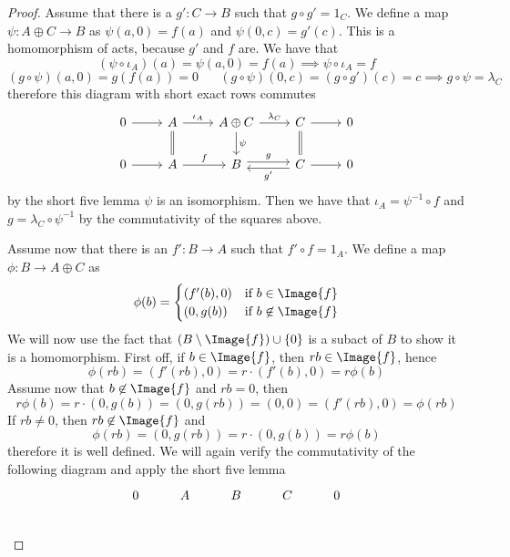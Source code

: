 \begin{proof}[Proof]
    Assume that there is a $g':C \to B$ such that $g\circ g' = 1_C$. We define a map $\psi: A\oplus C \to B$ as 
    $\psi(a,0) = f(a)$ and $\psi(0,c) = g'(c)$. This is a homomorphism of acts, because $g'$ and $f$ are. We have that 
    \[
        (\psi\circ \iota_A)(a) = \psi(a,0) = f(a) \implies \psi\circ\iota_A = f
    \]
    \[
        (g\circ\psi)(a,0) = g(f(a)) = 0\hspace{20pt} (g\circ\psi)(0,c) = (g\circ g')(c) = c \implies g\circ\psi = \lambda_C
    \]
    therefore this diagram with short exact rows commutes
    \[\begin{tikzcd}
	0 & A & {A\oplus C} & C & 0 \\
	0 & A & B & C & 0
	\arrow[from=1-1, to=1-2]
	\arrow["{\iota_A}", from=1-2, to=1-3]
	\arrow[equal,from=1-2, to=2-2]
	\arrow["{\lambda_C}", from=1-3, to=1-4]
	\arrow["\psi", from=1-3, to=2-3]
	\arrow[from=1-4, to=1-5]
	\arrow[equal,from=1-4, to=2-4]
	\arrow[from=2-1, to=2-2]
	\arrow["f", from=2-2, to=2-3]
	\arrow["g", shift left, from=2-3, to=2-4]
	\arrow["{g'}", shift left, from=2-4, to=2-3]
	\arrow[from=2-4, to=2-5]
\end{tikzcd}\]
    by the short five lemma $\psi$ is an isomorphism. Then we have that $\iota_A = \psi^{-1}\circ f$ and $g = \lambda_C\circ\psi^{-1}$ 
    by the commutativity of the squares above.\par 
    Assume now that there is an $f': B \to A$ such that $f'\circ f = 1_A$. We define a map $\phi: B \to A\oplus C$ as
    \[
        \phi(b) = \begin{cases}
            (f'(b),0) & \text{if } b\in\Image{f} \\
            (0,g(b)) & \text{if } b\not\in\Image{f}
        \end{cases}
    \]
    We will now use the fact that $(B\setminus\Image{f})\cup\{0\}$ is a subact of $B$ to show it is a homomorphism. First off, if 
    $b\in\Image{f}$, then $rb\in\Image{f}$, hence 
    \[
    \phi(rb) = (f'(rb),0)= r\cdot(f'(b),0) = r\phi(b)
    \]
    Assume now that $b\not\in\Image{f}$ and $rb=0$, then 
    \[
        r\phi(b) = r\cdot(0,g(b)) = (0,g(rb)) = (0,0) = (f'(rb),0) = \phi(rb)
    \]
    If $rb\neq 0$, then $rb\not\in\Image{f}$ and 
    \[
        \phi(rb) = (0,g(rb)) = r\cdot(0,g(b)) = r\phi(b)
    \]
    therefore it is well defined. We will again verify the commutativity of the following diagram and apply the short five lemma
    \[\begin{tikzcd}
        0 & A & B & C & 0 \\

\end{tikzcd}\]
\end{proof}
